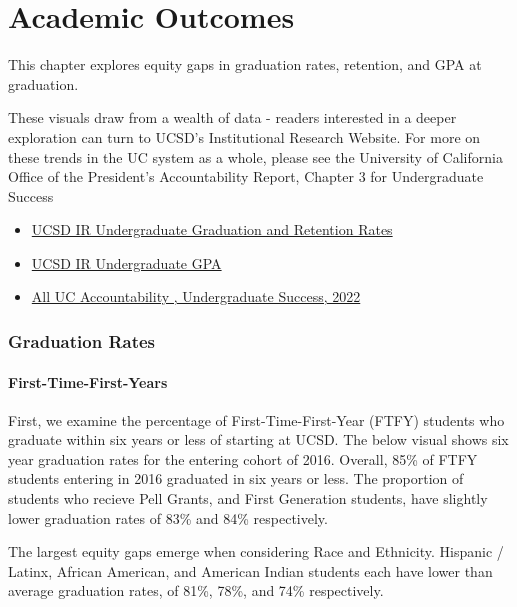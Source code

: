\documentclass[
  letterpaper,
  DIV=11,
  numbers=noendperiod]{scrreprt}
\begin{document}

\hypertarget{academic-outcomes}{%
\chapter{Academic Outcomes}\label{academic-outcomes}}

This chapter explores equity gaps in graduation rates, retention, and
GPA at graduation.

These visuals draw from a wealth of data - readers interested in a
deeper exploration can turn to UCSD's Institutional Research Website.
For more on these trends in the UC system as a whole, please see the
University of California Office of the President's Accountability
Report, Chapter 3 for Undergraduate Success

\begin{itemize}
\item
  \href{https://ir.ucsd.edu/undergrad/stats-data/ug-retention.html}{UCSD
  IR Undergraduate Graduation and Retention Rates}
\item
  \href{https://ir.ucsd.edu/undergrad/stats-data/ug-degree.html}{UCSD IR
  Undergraduate GPA}
\item
  \href{https://accountability.universityofcalifornia.edu/2022/chapters/chapter-3.html}{All
  UC Accountability , Undergraduate Success, 2022}
\end{itemize}

\hypertarget{graduation-rates}{%
\subsection{Graduation Rates}\label{graduation-rates}}

\hypertarget{first-time-first-years}{%
\subsubsection{First-Time-First-Years}\label{first-time-first-years}}

First, we examine the percentage of First-Time-First-Year (FTFY)
students who graduate within six years or less of starting at UCSD. The
below visual shows six year graduation rates for the entering cohort of
2016. Overall, 85\% of FTFY students entering in 2016 graduated in six
years or less. The proportion of students who recieve Pell Grants, and
First Generation students, have slightly lower graduation rates of 83\%
and 84\% respectively.

The largest equity gaps emerge when considering Race and Ethnicity.
Hispanic / Latinx, African American, and American Indian students each
have lower than average graduation rates, of 81\%, 78\%, and 74\%
respectively.
\end{document}
